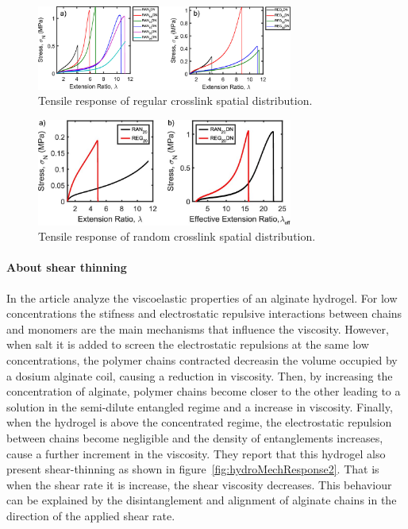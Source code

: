 \begin{figure}[ht!]
    \centering
    \includegraphics[width=0.75\textwidth]{figs/explainMechResponse/REGRANDN.jpeg}
    \caption{Tensile response of regular crosslink spatial distribution\citep{kongEffectCrossLinkHomogeneity2024}.}\label{fig:RANnetworks}
\end{figure}



\begin{figure}[ht!]
    \centering
    \includegraphics[width=0.75\textwidth]{figs/explainMechResponse/comparissonREGRANDN.jpeg}
    \caption{Tensile response of random crosslink spatial distribution\citep{kongEffectCrossLinkHomogeneity2024}.}\label{fig:REGRANDNcomparison}
\end{figure}


\paragraph{About shear thinning}
In the article\citep{varela-feijooMultiscaleInvestigationViscoelastic2023} analyze the viscoelastic properties of an alginate hydrogel.
For low concentrations the stifness and electrostatic repulsive interactions between chains and monomers are the main mechanisms that influence the viscosity.
However, when salt it is added to screen the electrostatic repulsions at the same low concentrations, the polymer chains contracted decreasin the volume occupied by a dosium alginate coil, causing a reduction in viscosity.
Then, by increasing the concentration of alginate, polymer chains become closer to the other leading to a solution in the semi-dilute entangled regime and a increase in viscosity.
Finally, when the hydrogel is above the concentrated regime, the electrostatic repulsion between chains become negligible and the density of entanglements increases, cause a further increment in the viscosity.
They report that this hydrogel also present shear-thinning as shown in figure~\ref{fig:hydroMechResponse2}.
That is when the shear rate it is increase, the shear viscosity decreases.
This behaviour can be explained by the disintanglement and alignment of alginate chains in the direction of the applied shear rate.

